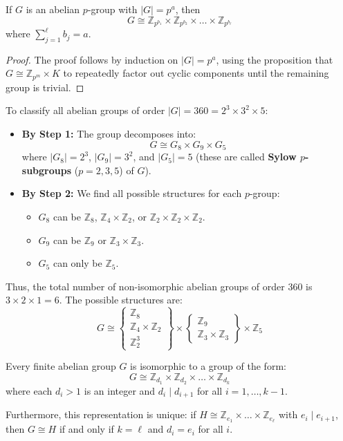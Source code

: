 \begin{corollary}
If $G$ is an abelian $p$-group with $|G| = p^a$, then 
\[ G \cong \mathbb{Z}_{p^{b_1}} \times \mathbb{Z}_{p^{b_2}} \times \dots \times \mathbb{Z}_{p^{b_\ell}} \]
where $\sum_{j=1}^{\ell} b_j = a$.
\end{corollary}
\begin{proof}
The proof follows by induction on $|G| = p^a$, using the proposition that $G \cong \mathbb{Z}_{p^m} \times K$ to repeatedly factor out cyclic components until the remaining group is trivial.
\end{proof}

\begin{example}
To classify all abelian groups of order $|G| = 360 = 2^3 \times 3^2 \times 5$:
\begin{itemize}
    \item \textbf{By Step 1:} The group decomposes into:
    \[ G \cong G_8 \times G_9 \times G_5 \]
    where $|G_8| = 2^3$, $|G_9| = 3^2$, and $|G_5| = 5$ (these are called {\bf Sylow $p$-subgroups} ($p = 2,3,5$) of $G$).
    \item \textbf{By Step 2:} We find all possible structures for each $p$-group:
    \begin{itemize}
        \item $G_8$ can be $\mathbb{Z}_8$, $\mathbb{Z}_4 \times \mathbb{Z}_2$, or $\mathbb{Z}_2 \times \mathbb{Z}_2 \times \mathbb{Z}_2$.
        \item $G_9$ can be $\mathbb{Z}_9$ or $\mathbb{Z}_3 \times \mathbb{Z}_3$.
        \item $G_5$ can only be $\mathbb{Z}_5$.
    \end{itemize}
\end{itemize}
Thus, the total number of non-isomorphic abelian groups of order 360 is $3 \times 2 \times 1 = 6$. The possible structures are:
\[ G \cong \left\{ \begin{matrix} \mathbb{Z}_8 \\ \mathbb{Z}_4 \times \mathbb{Z}_2 \\ \mathbb{Z}_2^3 \end{matrix} \right\} \times \left\{ \begin{matrix} \mathbb{Z}_9 \\ \mathbb{Z}_3 \times \mathbb{Z}_3 \end{matrix} \right\} \times \mathbb{Z}_5 \]
\end{example}

\begin{corollary}
Every finite abelian group $G$ is isomorphic to a group of the form:
\[ G \cong \mathbb{Z}_{d_1} \times \mathbb{Z}_{d_2} \times \dots \times \mathbb{Z}_{d_k} \]
where each $d_i > 1$ is an integer and $d_i \mid d_{i+1}$ for all $i = 1, \dots, k-1$. 

Furthermore, this representation is unique: if $H \cong \mathbb{Z}_{e_1} \times \dots \times \mathbb{Z}_{e_\ell}$ with $e_i \mid e_{i+1}$, then $G \cong H$ if and only if $k = \ell$ and $d_i = e_i$ for all $i$.
\end{corollary}